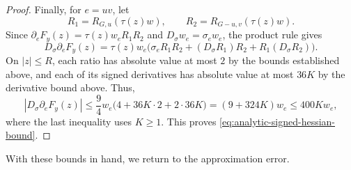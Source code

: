 \documentclass[11pt,reqno,letterpaper]{amsart}
\numberwithin{equation}{section}
\theoremstyle{definition}
\theoremstyle{remark}
\begin{document}
\begin{proof}
Finally, for $e=uv$, let
\[
 R_1=R_{G,u}(\tau(z)w),
 \qquad
 R_2=R_{G-u,v}(\tau(z)w).
\]
Since $\partial_eF_y(z)=\tau(z)w_eR_1R_2$ and
$D_\sigma w_e=\sigma_ew_e$, the product rule gives
\[
 D_\sigma\partial_eF_y(z)
 =\tau(z)w_e\bigl(
   \sigma_eR_1R_2+(D_\sigma R_1)R_2+R_1(D_\sigma R_2)
   \bigr).
\]
On $|z|\le R$, each ratio has absolute value at most $2$
by the bounds established above, and each of its signed derivatives
has absolute value at most $36K$ by
the derivative bound above. Thus,
\[
 |D_\sigma\partial_eF_y(z)|
 \le\frac94w_e\bigl(4+36K\cdot2+2\cdot36K\bigr)
 =(9+324K)w_e
 \le400K w_e,
\]
where the last inequality uses $K\ge1$. This proves
\cref{eq:analytic-signed-hessian-bound}.
\end{proof}

With these bounds in hand, we return to the approximation error.
\end{document}
